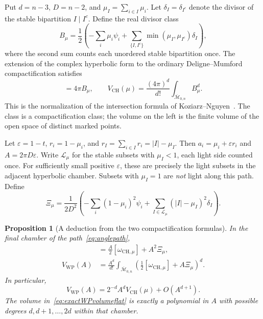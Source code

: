 \documentclass[11pt,a4paper]{article}
\numberwithin{equation}{section}
\newtheorem{proposition}[theorem]{Proposition}
\theoremstyle{definition}
\theoremstyle{remark}
\newcommand{\WP}{\mathrm{WP}}
\newcommand{\MM}{\overline{\mathcal M}}
\begin{document}
Put $d=n-3$, $D=n-2$, and $\mu_I=\sum_{i\in I}\mu_i$. Let
$\delta_I=\delta_{I^c}$ denote the divisor of the stable bipartition
$I\mid I^c$. Define the real divisor class
\begin{equation}
 B_\mu=\frac12\left(
   -\sum_i\mu_i\psi_i+
   \sum_{\{I,I^c\}}\min(\mu_I,\mu_{I^c})\delta_I\right),
 \label{eq:CHclassB}
\end{equation}
where the second sum counts each unordered stable bipartition once.
The extension of the complex hyperbolic form to the ordinary
Deligne--Mumford compactification satisfies
\begin{equation}
 [\omega_{\mathrm{CH},\mu}]=4\pi B_\mu,\qquad
 V_{\mathrm{CH}}(\mu)=\frac{(4\pi)^d}{d!}
                     \int_{\MM_{0,n}}B_\mu^d.
 \label{eq:CHintersection}
\end{equation}
This is the normalization of the intersection formula of
Koziarz--Nguyen~\cite{KoziarzNguyen}. The class is a compactification
class; the volume on the left is the finite volume of the open
space of distinct marked points.

Let $\varepsilon=1-t$, $r_i=1-\mu_i$, and
$r_I=\sum_{i\in I}r_i=|I|-\mu_I$. Then
$a_i=\mu_i+\varepsilon r_i$ and $A=2\pi D\varepsilon$. Write
$\mathcal L_\mu$ for the stable subsets with $\mu_I<1$, each light
side counted once. For sufficiently small positive $\varepsilon$,
these are precisely the light subsets in the adjacent hyperbolic
chamber. Subsets with $\mu_I=1$ are \emph{not} light along this path.
Define
\begin{equation}
 \boxed{\quad
 \Xi_\mu=\frac{1}{2D^2}\left(
 -\sum_i(1-\mu_i)^2\psi_i+
 \sum_{I\in\mathcal L_\mu}(|I|-\mu_I)^2\delta_I\right).
 \quad}
 \label{eq:Xiclass}
\end{equation}

\begin{proposition}[A deduction from the two compactification formulas]
In the final chamber of the path~\eqref{eq:anglepath},
\begin{align}
 [\omega_{\WP}(A)]
   &=\frac A2[\omega_{\mathrm{CH},\mu}]+A^2\Xi_\mu,
       \label{eq:exactWPclassflat}\\
 V_{\WP}(A)
   &=\frac{A^d}{d!}\int_{\MM_{0,n}}
       \left(\frac12[\omega_{\mathrm{CH},\mu}]+A\Xi_\mu\right)^d.
       \label{eq:exactWPvolumeflat}
\end{align}
In particular,
\begin{equation}
 \boxed{\quad
 V_{\WP}(A)=2^{-d}A^d V_{\mathrm{CH}}(\mu)+O(A^{d+1}).
 \quad}
 \label{eq:WPCHvolumeasymptotic}
\end{equation}
The volume in~\eqref{eq:exactWPvolumeflat} is exactly a polynomial in
$A$ with possible degrees $d,d+1,\ldots,2d$ within that chamber.
\end{proposition}
\end{document}
